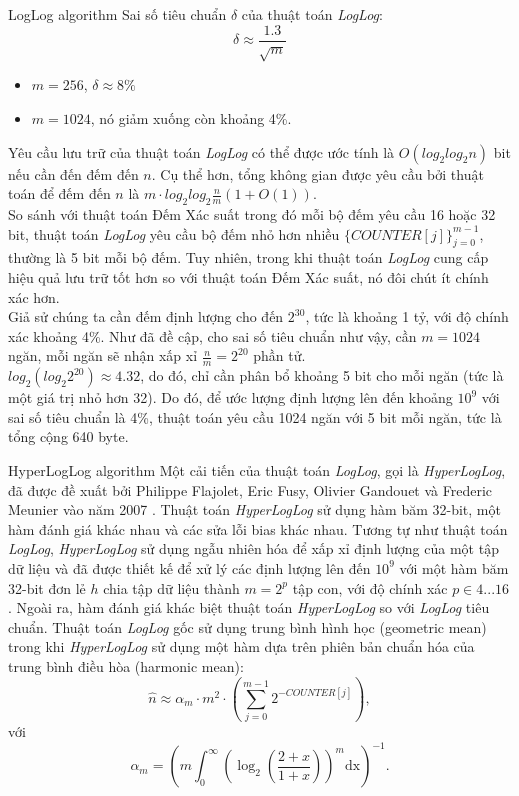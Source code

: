 \documentclass[10pt]{beamer}
\begin{document}
\begin{frame}{LogLog algorithm}
Sai số tiêu chuẩn $\delta$ của thuật toán \textit{LogLog}:
\[\delta \approx \frac{1.3}{\sqrt{m}}\]
\begin{itemize}
  \item $m = 256$, $\delta \approx 8\%$
  \item $m = 1024$, nó giảm xuống còn khoảng 4\%.
\end{itemize}
\indent Yêu cầu lưu trữ của thuật toán \textit{LogLog} có thể được ước tính là $O(log_2log_2n)$ bit nếu cần đến đếm đến $n$. Cụ thể hơn, 
tổng không gian được yêu cầu bởi thuật toán để đếm đến $n$ là $m\cdot log_2log_2\frac{n}{m}(1 + O(1))$.\\
So sánh với thuật toán Đếm Xác suất trong đó mỗi bộ đếm yêu cầu 16 hoặc 32 bit, thuật toán \textit{LogLog} yêu cầu bộ đếm nhỏ hơn 
nhiều $\{COUNTER[j]\}_{j=0}^{m-1}$, thường là 5 bit mỗi bộ đếm. Tuy nhiên, trong khi thuật toán \textit{LogLog} cung cấp hiệu quả lưu trữ tốt hơn 
so với thuật toán Đếm Xác suất, nó đôi chút ít chính xác hơn.\\
Giả sử chúng ta cần đếm định lượng cho đến $2^{30}$, tức là khoảng 1 tỷ, với độ chính xác khoảng 4\%. Như đã đề cập, cho sai số tiêu chuẩn như vậy, 
cần $m = 1024$ ngăn, mỗi ngăn sẽ nhận xấp xỉ $\frac{n}{m} = 2^{20}$ phần tử.\\
$log_2\left(log_{2}2^{20}\right) \approx 4.32$, do đó, chỉ cần phân bổ khoảng 5 bit cho mỗi ngăn (tức là một giá trị nhỏ hơn 32). 
Do đó, để ước lượng định lượng lên đến khoảng $10^9$ với sai số tiêu chuẩn là 4\%, thuật toán yêu cầu 1024 ngăn với 5 bit mỗi ngăn, 
tức là tổng cộng 640 byte.
\end{frame}
\begin{frame}{HyperLogLog algorithm}
  Một cải tiến của thuật toán \textit{LogLog}, gọi là \textit{HyperLogLog}, đã được đề xuất bởi Philippe Flajolet, Eric Fusy, Olivier Gandouet và 
  Frederic Meunier vào năm 2007 \cite{flajolet2007hyperloglog}. Thuật toán \textit{HyperLogLog} sử dụng hàm băm 32-bit, một hàm đánh giá khác nhau và các sửa lỗi bias khác nhau.
  Tương tự như thuật toán \textit{LogLog}, \textit{HyperLogLog} sử dụng ngẫu nhiên hóa để xấp xỉ định lượng của một tập dữ liệu và đã được 
  thiết kế để xử lý các định lượng lên đến $10^9$ với một hàm băm 32-bit đơn lẻ $h$ chia tập dữ liệu thành $m = 2^p$ tập con, với độ chính xác $p \in 4...16$.
  Ngoài ra, hàm đánh giá khác biệt thuật toán \textit{HyperLogLog} so với \textit{LogLog} tiêu chuẩn. Thuật toán \textit{LogLog} gốc sử dụng 
  trung bình hình học (geometric mean) trong khi \textit{HyperLogLog} sử dụng một hàm dựa trên phiên bản chuẩn hóa của trung bình điều hòa (harmonic mean):
  \[
      \hat{n} \approx \alpha_m \cdot m^2 \cdot \left(\sum_{j=0}^{m-1}2^{-COUNTER[j]}\right),
  \]
  \indent với
  \[
      \alpha_m = \left(m\int_0^\infty\left(\log_2\left(\frac{2+x}{1+x}\right)\right)^m\text{dx}\right)^{-1}.    
  \]
\end{frame}
\end{document}
